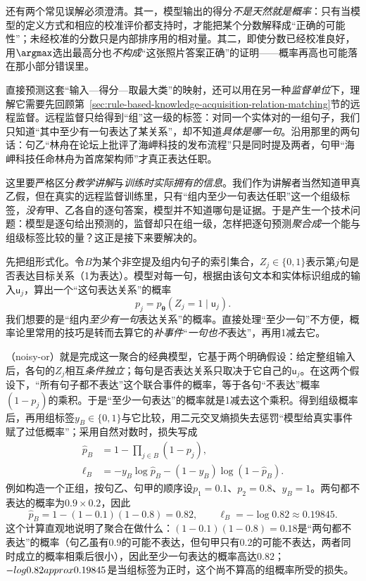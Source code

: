 还有两个常见误解必须澄清。其一，模型输出的得分\emph{不是天然就是概率}：只有当模型的定义方式和相应的校准评价都支持时，才能把某个分数解释成“正确的可能性”；未经校准的分数只是内部排序用的相对量。其二，即使分数已经校准良好，用$\argmax$选出最高分也\emph{不构成}“这张照片答案正确”的证明——概率再高也可能落在那小部分错误里。

直接预测这套“输入—得分—取最大类”的映射，还可以用在另一种\emph{监督单位}下，理解它需要先回顾第~\ref{sec:rule-based-knowledge-acquisition-relation-matching}节的远程监督。远程监督只给得到“组”这一级的标签：对同一个实体对的一组句子，我们只知道“其中至少有一句表达了某关系”，却不知道\emph{具体是哪一句}。沿用那里的两句话：句乙“林舟在论坛上批评了海岬科技的发布流程”只是同时提及两者，句甲“海岬科技任命林舟为首席架构师”才真正表达任职。

这里要严格区分\emph{教学讲解}与\emph{训练时实际拥有的信息}。我们作为讲解者当然知道甲真乙假，但在真实的远程监督训练里，只有“组内至少一句表达任职”这一个组级标签，\emph{没有}甲、乙各自的逐句答案，模型并不知道哪句是证据。于是产生一个技术问题：模型是逐句给出预测的，监督却只在组一级，怎样把逐句预测\emph{聚合成}一个能与组级标签比较的量？这正是接下来要解决的。

先把组形式化。令$B$为某个非空提及组内句子的索引集合，$Z_j\in\{0,1\}$表示第$j$句是否表达目标关系（1为表达）。模型对每一句，根据由该句文本和实体标识组成的输入$\mathsf{u}_j$，算出一个“这句表达关系”的概率
\[
  p_j=p_{\bm{\theta}}(Z_j=1\mid\mathsf{u}_j).
\]
我们想要的是“组内\emph{至少有一句}表达关系”的概率。直接处理“至少一句”不方便，概率论里常用的技巧是转而去算它的\emph{补事件}“\emph{一句也不}表达”，再用1减去它。

（noisy-or）就是完成这一聚合的经典模型，它基于两个明确假设：给定整组输入后，各句的$Z_j$相互\emph{条件独立}；每句是否表达关系只取决于它自己的$\mathsf{u}_j$。在这两个假设下，“所有句子都不表达”这个联合事件的概率，等于各句“不表达”概率$(1-p_j)$的乘积。于是“至少一句表达”的概率就是1减去这个乘积。得到组级概率后，再用组标签$y_B\in\{0,1\}$与它比较，用二元交叉熵损失去惩罚“模型给真实事件赋了过低概率”；采用自然对数时，损失写成
\begin{equation}
  \begin{aligned}
    \widehat p_B
    &=1-\prod_{j\in B}(1-p_j),\\
    \ell_B
    &=-y_B\log\widehat p_B
      -(1-y_B)\log(1-\widehat p_B).
  \end{aligned}
  \label{eq:knowledge-acquisition-model-bag-prediction}
\end{equation}
例如构造一个正组，按句乙、句甲的顺序设$p_1=0.1$、$p_2=0.8$、$y_B=1$。两句都不表达的概率为$0.9\times0.2$，因此
\[
  \widehat p_B=1-(1-0.1)(1-0.8)=0.82,
  \qquad
  \ell_B=-\log0.82\approx0.19845.
\]
这个计算直观地说明了聚合在做什么：$(1-0.1)(1-0.8)=0.18$是“两句都不表达”的概率（句乙虽有0.9的可能不表达，但句甲只有0.2的可能不表达，两者同时成立的概率相乘后很小），因此至少一句表达的概率高达$0.82$；$-\\log0.82\\approx0.19845$是当组标签为正时，这个尚不算高的组概率所受的损失。

